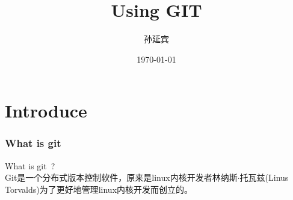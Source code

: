 ﻿\documentclass{beamer}
\title{Using GIT}
\author{孙延宾}
\institute{业务软件开发一部$\cdot$西安}
\date{\today}
\begin{document}
\begin{frame}[plain]
  \titlepage
\end{frame}

\part[Introduce]{Introduce}
\section[What is git]{What is git}
\begin{frame}
\begin{framedtext}
  What is git~?\\[1em]
  Git是一个分布式版本控制软件，原来是linux内核开发者林纳斯$\cdot$托瓦兹(Linus Torvalds)为了更好地管理linux内核开发而创立的。
\end{framedtext}
\end{frame}
\end{document}
